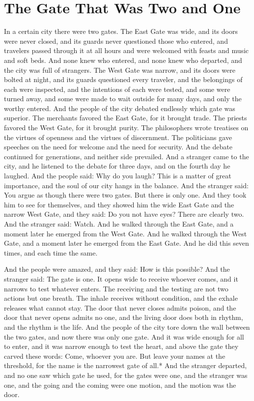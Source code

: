\documentclass[12pt,openany]{book}
\begin{document}
\chapter{The Gate That Was Two and One}

In a certain city there were two gates. The East Gate was wide, and its doors were never closed, and its guards never questioned those who entered, and travelers passed through it at all hours and were welcomed with feasts and music and soft beds. And none knew who entered, and none knew who departed, and the city was full of strangers. The West Gate was narrow, and its doors were bolted at night, and its guards questioned every traveler, and the belongings of each were inspected, and the intentions of each were tested, and some were turned away, and some were made to wait outside for many days, and only the worthy entered. And the people of the city debated endlessly which gate was superior. The merchants favored the East Gate, for it brought trade. The priests favored the West Gate, for it brought purity. The philosophers wrote treatises on the virtues of openness and the virtues of discernment. The politicians gave speeches on the need for welcome and the need for security. And the debate continued for generations, and neither side prevailed. And a stranger came to the city, and he listened to the debate for three days, and on the fourth day he laughed. And the people said: Why do you laugh? This is a matter of great importance, and the soul of our city hangs in the balance. And the stranger said: You argue as though there were two gates. But there is only one. And they took him to see for themselves, and they showed him the wide East Gate and the narrow West Gate, and they said: Do you not have eyes? There are clearly two. And the stranger said: Watch. And he walked through the East Gate, and a moment later he emerged from the West Gate. And he walked through the West Gate, and a moment later he emerged from the East Gate. And he did this seven times, and each time the same.


And the people were amazed, and they said: How is this possible? And the stranger said: The gate is one. It opens wide to receive whoever comes, and it narrows to test whatever enters. The receiving and the testing are not two actions but one breath. The inhale receives without condition, and the exhale releases what cannot stay. The door that never closes admits poison, and the door that never opens admits no one, and the living door does both in rhythm, and the rhythm is the life. And the people of the city tore down the wall between the two gates, and now there was only one gate. And it was wide enough for all to enter, and it was narrow enough to test the heart, and above the gate they carved these words: Come, whoever you are. But leave your names at the threshold, for the name is the narrowest gate of all.* And the stranger departed, and no one saw which gate he used, for the gates were one, and the stranger was one, and the going and the coming were one motion, and the motion was the door.
\end{document}
